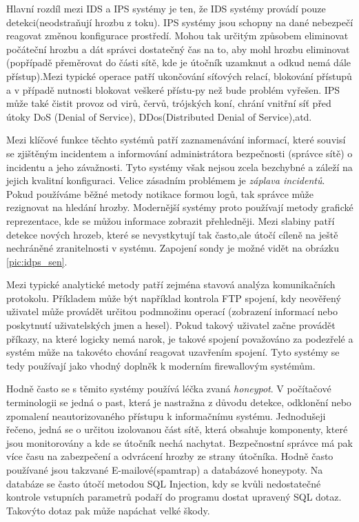 \documentclass[11pt,a4paper]{article}
\begin{document}
Hlavní rozdíl mezi IDS a IPS systémy je ten, že IDS systémy provádí pouze detekci(neodstraňují hrozbu z toku). IPS systémy jsou schopny na dané nebezpečí reagovat změnou konfigurace prostředí. Mohou tak určitým způsobem eliminovat počáteční hrozbu a dát správci dostatečný čas na to, aby mohl hrozbu eliminovat (popřípadě přeměrovat do části sítě, kde je útočník uzamknut a odkud nemá dále přístup).Mezi typické operace patří ukončování síťových relací, blokování přístupů a v případě nutnosti blokovat veškeré přístu-py než bude problém vyřešen. IPS může také čistit provoz od virů, červů, trójských koní, chrání vnitřní síť před útoky DoS (Denial of Service), DDos(Distributed Denial of Service),atd.

Mezi klíčové funkce těchto systémů patří zaznamenávání informací, které souvisí se zjištěným incidentem a informování administrátora bezpečnosti (správce sítě) o incidentu a jeho závažnosti. Tyto systémy však nejsou zcela bezchybné a záleží na jejich kvalitní konfiguraci. Velice zásadním problémem je \textit{záplava incidentů}. Pokud používáme běžné metody notikace formou logů, tak správce může rezignovat na hledání hrozby. Modernější systémy proto používají metody grafické reprezentace, kde se můžou informace zobrazit přehledněji. Mezi slabiny patří detekce nových hrozeb, které se nevystkytují tak často,ale útočí cíleně na ještě nechráněné zranitelnosti v systému. Zapojení sondy je možné vidět na obrázku \ref{pic:idps_sen}.

Mezi typické analytické metody patří zejména stavová analýza komunikačních protokolu. Příkladem může být například kontrola FTP spojení, kdy neověřený uživatel může provádět určitou podmnožinu operací (zobrazení informací nebo poskytnutí uživatelských jmen a hesel). Pokud takový uživatel začne provádět příkazy, na které logicky nemá narok, je takové spojení považováno za podezřelé a systém může na takovéto chování reagovat uzavřením spojení. Tyto systémy se tedy používají jako vhodný doplněk k moderním firewallovým systémům.

Hodně často se s těmito systémy používá léčka zvaná \textit{honeypot}. V počítačové terminologii se jedná o past, která je nastražna z důvodu detekce, odklonění nebo zpomalení neautorizovaného přístupu k informačnímu systému. Jednodušeji řečeno, jedná se o určitou izolovanou část sítě, která obsahuje komponenty, které jsou monitorovány a kde se útočník nechá nachytat. Bezpečnostní správce má pak více času na zabezpečení a odvrácení hrozby ze strany útočníka. Hodně často používané jsou takzvané E-mailové(spamtrap) a databázové honeypoty. Na databáze se často útočí metodou SQL Injection, kdy se kvůli nedostatečné kontrole vstupních parametrů podaří do programu dostat upravený SQL dotaz. Takovýto dotaz pak může napáchat velké škody. 
\end{document}

